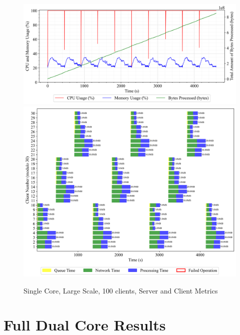 \newpage
\begin{figure}[h!t]
    \begin{center}
    \label{Fig:A1.4}
    \caption{Single Core, Large Scale, 100 clients, Server and Client Metrics}
    \includegraphics[width=\xLarge\textwidth]{Chapter4/Results/1c_results/arty-a7-1c_large_scale_1000_20241004_114004.db_server_metrics.png}
    \includegraphics[width=\xLarge\textwidth]{Chapter4/Results/1c_results/arty-a7-1c_large_scale_1000_20241004_114004.db_client_tasks.png}
    \end{center}
\end{figure}

\newpage
\section{Full Dual Core Results}

